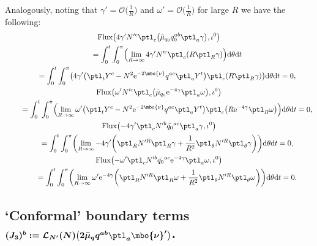 Analogously, noting that $\gamma' = \mathcal{O}\bigl(\frac{1}{R}\bigr)$ and $\omega' = \mathcal{O} \bigl(\frac{1}{R}\bigr)$ for large $R$ we have the following:
\begin{gather*}
{\rm Flux} \bigl(4\gamma' N'^c\ptl_c \bigl(\bar{\mu}_{q_0} q^{ab}_0 \ptl_a \gamma\bigr), \iota^0\bigr) \\
\qquad{} = \int^t_0 \int^\pi_0 \Bigl(\lim_{R \to \infty} 4 \gamma' N'^c \ptl_c (R \ptl_R \gamma)\Bigr) {\rm d}\theta {\rm d}t \notag\\
\qquad{} = \int^t_0 \int^\pi_0 \bigl(4 \gamma' \bigl(\ptl_t Y^c - N^2 {\rm e}^{-2 \mbo{\nu}} q^{ac} \ptl_a Y^t\bigr) \ptl_c (R \ptl_R \gamma) \bigr) {\rm d}\theta {\rm d}t
=0,
\\
 {\rm Flux} \bigl(\omega' N'^c \ptl_c \bigl(\bar{\mu}_{q_0} {\rm e}^{-4\gamma} \ptl_a \omega\bigr), \iota^0\bigr) \notag\\
\qquad{} = \int^t_0 \int^\pi_0 \Bigl(\lim_{R \to \infty} \omega' \bigl(\ptl_t Y^c - N^2 {\rm e}^{-2 \mbo{\nu}} q^{ac} \ptl_a Y^t\bigr) \ptl_c \bigl(R {\rm e}^{-4\gamma} \ptl_R \omega\bigr)\Bigr) {\rm d}\theta {\rm d}t
 =0,
\\
 {\rm Flux} \bigl(-4\gamma' \ptl_c N'^b \bar{q_0}^{ac} \ptl_a \gamma, \iota^0\bigr) \notag\\
\qquad{} = \int^t_0 \int^\pi_0 \biggl(\lim_{R \to \infty} -4 \gamma' \biggl(\ptl_R N'^R \ptl_R \gamma + \frac{1}{R^2} \ptl_\theta N'^R \ptl_\theta \gamma \biggr)\biggr) {\rm d}\theta {\rm d}t
 = 0,
\\
 {\rm Flux} \bigl(-\omega' \ptl_c N'^b \bar{q_0}^{ac} {\rm e}^{-4\gamma} \ptl_a \omega, \iota^0\bigr) \notag\\
\qquad{} = \int^t_0 \int^\pi_0 \biggl(\lim_{R \to \infty} \omega' {\rm e}^{-4\gamma} \biggl(\ptl_R N'^R \ptl_R \omega + \frac{1}{R^2} \ptl_\theta N'^R \ptl_\theta \omega \biggr)\biggr) {\rm d}\theta {\rm d}t
 =0.
\end{gather*}

\subsection*{`Conformal' boundary terms $\boldsymbol{
(J_3)^b := \mathcal{L}_{N'} (N) \bigl(2 \bar{\mu}_q q^{ab} \ptl_a \mbo{\nu}'\bigr)}$.}

